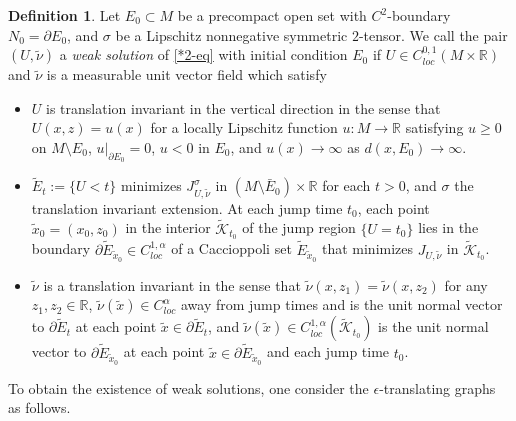 \documentclass[11pt,letterpaper]{amsart}
\theoremstyle{definition}
\newtheorem{defn}[thm]{Definition}
\theoremstyle{remark}
\begin{document}
\begin{defn}\label{defn-weak}
	Let $E_0 \subset M$ be a precompact open set with $C^2$-boundary $N_0= \partial E_0$, and $\sigma $ be a Lipschitz nonnegative symmetric $2$-tensor. We call the pair $(U, \tilde{\nu })$ a \textit{weak solution} of \ref{*2-eq} with initial condition $E_0$ if $U \in C^{0,1}_{loc}(M \times \mathbb{R})$ and $\tilde{\nu } $ is a measurable unit vector field which satisfy
	\begin{itemize}
		\item [(i)] $U$ is translation invariant in the vertical direction in the sense that $U(x,z) = u(x)$ for a locally Lipschitz function $u: M \to \mathbb{R}$ satisfying $u \geq 0$ on $M \setminus E_0$, $u|_{\partial E_0} =0$, $u<0$ in $E_0$, and $u(x) \to \infty$ as $d(x, E_0) \to \infty$.
		\item [(ii)] $\tilde{E}_t := \{ U< t\} $ minimizes $J_{U, \tilde{\nu }} ^{\sigma }$ in $(M\setminus \bar{E}_0) \times \mathbb{R}$ for each $t>0$, and $\sigma $ the translation invariant extension. At each jump time $t_0$, each point $\tilde{x}_0=(x_0, z_0)$ in the interior $\tilde{\mathcal{K}}_{t_0}$ of the jump region $\{U = t_0\} $ lies in the boundary $\partial \tilde{E}_{\tilde{x}_0} \in C^{1,\alpha }_{loc}$ of a Caccioppoli set $\tilde{E}_{\tilde{x}_0}$ that minimizes $J_{U, \tilde{\nu }}$ in $\tilde{\mathcal{K}}_{t_0}$.
		\item [(iii)] $\tilde{\nu }$ is a translation invariant in the sense that $\tilde{\nu }(x, z_1) = \tilde{\nu} (x, z_2)$ for any $z_1, z_2 \in \mathbb{R}$, $\tilde{\nu }(\tilde{x}) \in C^{\alpha }_{loc}$ away from jump times and is the unit normal vector to $\partial \tilde{E}_t$ at each point $\tilde{x} \in \partial \tilde{E}_t$, and $\tilde{\nu }(\tilde{x}) \in C^{1,\alpha }_{loc}(\tilde{\mathcal{K}}_{t_0}) $ is the unit normal vector to $\partial \tilde{E}_{\tilde{x}_0}$ at each point $\tilde{x} \in \partial \tilde{E}_{\tilde{x}_0}$ and each jump time $t_0$.
	\end{itemize}
\end{defn}

To obtain the existence of weak solutions, one consider the $\epsilon $-translating graphs as follows.
\end{document}
